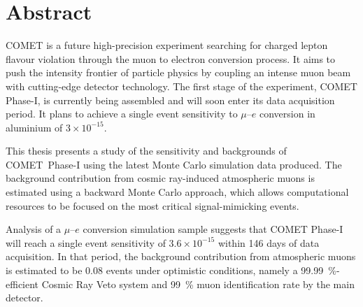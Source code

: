 \chapter*{Abstract}


COMET is a future high-precision experiment searching for charged lepton flavour
violation through the muon to electron conversion process. It aims to push the
intensity frontier of particle physics by coupling an intense muon beam with
cutting-edge detector technology. The first stage of the experiment, COMET
Phase-I, is currently being assembled and will soon enter its data acquisition
period. It plans to achieve a single event sensitivity to $\mu$--$e$ conversion
in aluminium of $3 \times 10^{-15}$.

This thesis presents a study of the sensitivity and backgrounds of \mbox{COMET
Phase-I} using the latest Monte Carlo simulation data produced. The background
contribution from cosmic ray-induced atmospheric muons is estimated using a
backward Monte Carlo approach, which allows computational resources to be
focused on the most critical signal-mimicking events.

Analysis of a $\mu$--$e$ conversion simulation sample suggests that COMET
Phase-I will reach a single event sensitivity of $3.6 \times 10^{-15}$ within 146
days of data acquisition. In that period, the background contribution from
atmospheric muons is estimated to be 0.08 events under optimistic conditions,
namely a \SI{99.99}{\percent}-efficient Cosmic Ray Veto system and
\SI{99}{\percent} muon identification rate by the main detector.